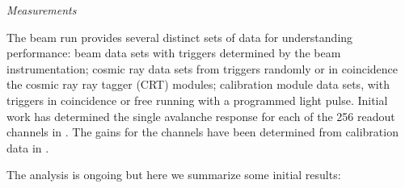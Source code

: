 


\textit{  Measurements}
\label{sec:protodune-results}


The  beam run provides several distinct sets of data for understanding  performance: beam data sets with triggers determined by the beam instrumentation; cosmic ray data sets from triggers randomly or in coincidence the cosmic ray ray tagger (CRT) modules; calibration module data sets, with triggers in coincidence or free running with a programmed light pulse. 
Initial work has determined the single avalanche response for each of the \num{256} readout channels in . The gains for the  channels have been determined from calibration data in .

The analysis is ongoing but here we summarize some initial results:

